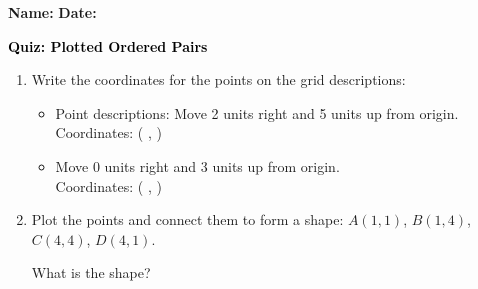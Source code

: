 \documentclass[12pt, letterpaper, fleqn]{article}
\newcommand{\blank}{\underline{\hspace{2.2cm}}}
\newcommand{\blanklong}{\underline{\hspace{6.5cm}}}
\begin{document}
\textbf{Name:} \underline{\hspace{5cm}}
\hfill
\textbf{Date:} \underline{\hspace{3cm}}\\

\begin{tcolorbox}[colback=customteal!20]
    \large\textcolor{black}{\textbf{Quiz: Plotted Ordered Pairs}}
\end{tcolorbox}

\vspace{5mm}
\begin{enumerate}[itemsep=3cm, leftmargin=0.6cm]
\item Write the coordinates for the points on the grid descriptions:
  \begin{itemize}[itemsep=1cm]
    \item Point descriptions: Move 2 units right and 5 units up from origin. \\ Coordinates: ( \blank, \blank )
    \item Move 0 units right and 3 units up from origin. \\ Coordinates: ( \blank, \blank )
  \end{itemize}

\item Plot the points and connect them to form a shape: $A(1,1)$, $B(1,4)$, $C(4,4)$, $D(4,1)$.
\begin{center}
\end{center}
What is the shape? \blanklong
\end{enumerate}
\end{document}
